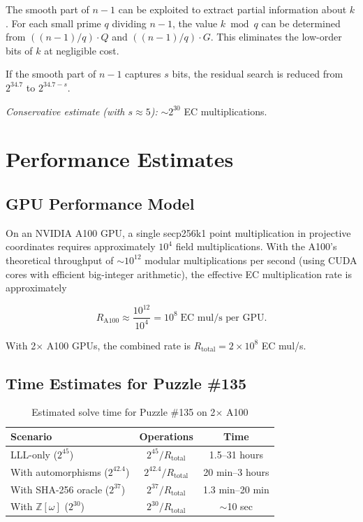 \documentclass[11pt,a4paper]{article}
\theoremstyle{definition}
\newcommand{\Zomega}{\mathbb{Z}[\omega]}
\begin{document}
The smooth part of $n - 1$ can be exploited to extract partial information about $k$. For each small prime $q$ dividing $n - 1$, the value $k \bmod q$ can be determined from $((n-1)/q) \cdot Q$ and $((n-1)/q) \cdot G$. This eliminates the low-order bits of $k$ at negligible cost.

If the smooth part of $n - 1$ captures $s$ bits, the residual search is reduced from $2^{34.7}$ to $2^{34.7 - s}$.

\textit{Conservative estimate (with $s \approx 5$):} $\sim 2^{30}$ EC multiplications.


\section{Performance Estimates}\label{sec:performance}

\subsection{GPU Performance Model}

On an NVIDIA A100 GPU, a single secp256k1 point multiplication in projective coordinates requires approximately $10^4$ field multiplications. With the A100's theoretical throughput of $\sim 10^{12}$ modular multiplications per second (using CUDA cores with efficient big-integer arithmetic), the effective EC multiplication rate is approximately

\begin{equation}
R_{\mathrm{A100}} \approx \frac{10^{12}}{10^4} = 10^8 \;\text{EC mul/s per GPU}.
\end{equation}

With 2$\times$ A100 GPUs, the combined rate is $R_{\mathrm{total}} = 2 \times 10^8$ EC mul/s.

\subsection{Time Estimates for Puzzle \#135}

\begin{table}[htbp]
\centering
\caption{Estimated solve time for Puzzle \#135 on 2$\times$ A100}
\label{tab:time}
\begin{tabular}{lcc}
\toprule
Scenario & Operations & Time \\
\midrule
LLL-only ($2^{45}$) & $2^{45} / R_{\mathrm{total}}$ & 1.5--31 hours \\
With automorphisms ($2^{42.4}$) & $2^{42.4} / R_{\mathrm{total}}$ & 20 min--3 hours \\
With SHA-256 oracle ($2^{37}$) & $2^{37} / R_{\mathrm{total}}$ & 1.3 min--20 min \\
With $\Zomega$ ($2^{30}$) & $2^{30} / R_{\mathrm{total}}$ & $\sim$10 sec \\
\bottomrule
\end{tabular}
\end{table}
\end{document}
